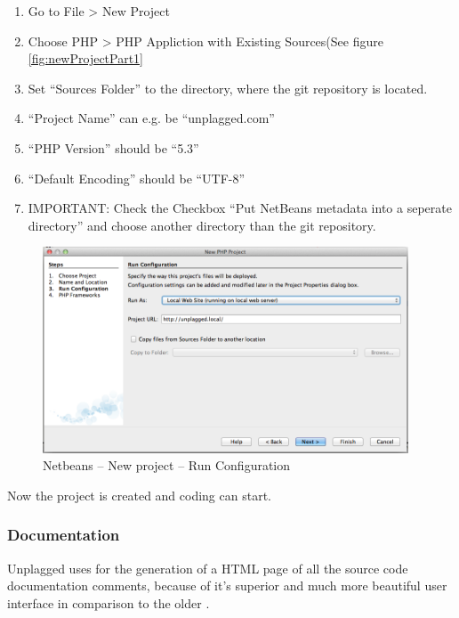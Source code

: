 \begin{enumerate}
\item Go to File > New Project
\item Choose PHP > PHP Appliction with Existing Sources(See figure \ref{fig:newProjectPart1}
\item Set \enquote{Sources Folder} to the directory, where the git repository is located.
\item \enquote{Project Name} can e.g. be \enquote{unplagged.com}
\item \enquote{PHP Version} should be \enquote{5.3}
\item \enquote{Default Encoding} should be \enquote{UTF-8}
\item IMPORTANT: Check the Checkbox \enquote{Put NetBeans metadata into a seperate directory} and choose another 
directory than the git repository.
\end{enumerate}


\begin{figure}[htbp]
  \centering
    \includegraphics[width=0.97\textwidth]{images/netbeans/02_run_as.png}
  \caption{Netbeans -- New project -- Run Configuration}
  \label{fig:newProjectPart2}
\end{figure}

Now the project is created and coding can start.

\subsubsection{Documentation}

Unplagged uses \href{http://apigen.org/}{\citet{Apigen}} for the generation of a HTML page of all the source code documentation comments, 
because of it's superior and much more beautiful user interface in comparison to the older 
\href{http://www.phpdoc.org/}{\citet{PHPDocumentor}}.

